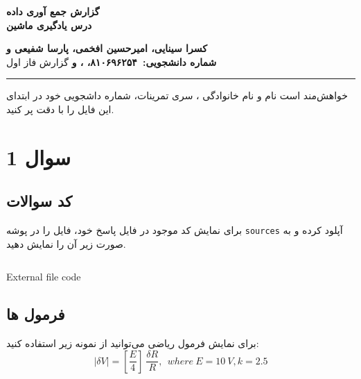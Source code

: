 
\def \Subject {گزارش جمع آوری داده }
\def \Course {درس یادگیری ماشین}
\def \Author {کسرا سینایی، امیرحسین افخمی، پارسا شفیعی و }
\def \Report {گزارش فاز اول}
\def \StudentNumber {۸۱۰۶۹۶۲۵۴، ، و }

\begin{center}
\vspace{.4cm}
{\bf {\huge \Subject}}\\
{\bf \Large \Course}
\vspace{.2cm}
\end{center}
{\bf \Author }  \\
{\bf شماره دانشجویی:\ \StudentNumber}
\hspace{\fill} 
{\Large \Report} \\
\hrule
\vspace{0.8cm}

\clearpage

\par
 خواهش‌مند است نام و نام خانوادگی ، سری تمرینات، شماره داشجویی خود در ابتدای این فایل را با دقت پر کنید.

\section{سوال 1}
\subsection{کد سوالات}

 برای نمایش کد موجود در فایل پاسخ خود،
 فایل را در پوشه 
 \texttt{sources}
 آپلود کرده و به صورت زیر آن را نمایش دهید. 
 
\begin{latin}
\begin{listing}[ht]
    \inputminted{octave}{sources/partition.py}
    \caption{External file code}
    \label{listing:}
\end{listing}
\end{latin}

\subsection{فرمول ها}
\par
برای نمایش فرمول ریاضی می‌توانید از نمونه زیر استفاده کنید:
		\begin{equation}
		|\delta V |=\left[ \frac{E}{4}\right] \ \frac{\delta R}{R}, \ \ where\ E=10\ V, k=2.5
		\end{equation}
\clearpage


